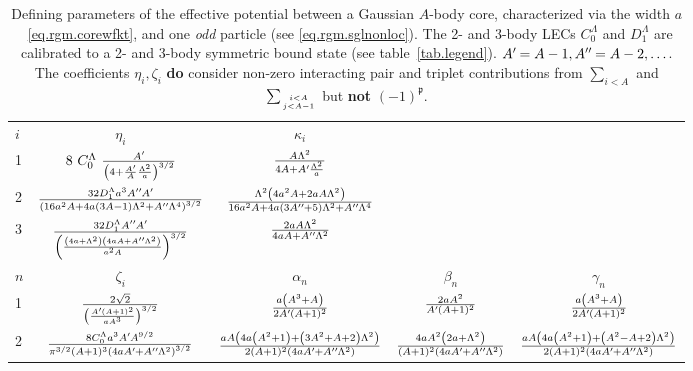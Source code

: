 \documentclass
[aps,nofootinbib,prl,showpacs,twocolumn,groupedaddress,superscriptaddress]
{revtex4}
\newcommand*{\mprime}{^{\prime}\mkern-1.2mu}
\newcommand*{\mdprime}{^{\prime\prime}\mkern-1.2mu}
\begin{document}
\begin{widetext}
\begin{turnpage}
\begin{table}
\setlength{\tabcolsep}{4pt}
\renewcommand{\arraystretch}{2.4}
\caption{\label{tab.rgmpot}{Defining parameters of the effective potential between
a Gaussian $A$-body core, characterized via the width $a$~\eqref{eq.rgm.corewfkt},
and one {\it odd} particle (see \eqref{eq.rgm.sglnonloc}).
The 2- and 3-body LECs $C^\Lambda_0$ and $D^\Lambda_1$ are
calibrated to a 2- and 3-body symmetric bound state (see table~\ref{tab.legend}).
$A\mprime=A-1, A\mdprime=A-2, \ldots$. The coefficients $\eta_i,\zeta_i$ {\bf do}
consider non-zero interacting pair and triplet contributions from $\sum_{i<A}$ and
$\sum_{i<A\atop j<A-1}$ but {\bf not} $(-1)^{\mathfrak{p}}$.}}
\small\centering
\begin{tabular}{lc|ccc}
\hline\hline
$i$ & $\eta_i$ & $\kappa_i$ & & \\
1   & $8~C_0^\Lambda~\frac{A\mprime}{\left(4+\frac{A\mprime}{A}\frac{\Lambda^2}{a}\right)^{3/2}}$  & $\frac{A\Lambda^2}{4A+A\mprime\frac{\Lambda^2}{a}}$ \\
2   & $
\frac{32 D_1^\Lambda a^3 A\mdprime A\mprime}{\left(16 a^2 A+4 a (3 A-1) \Lambda ^2+A\mdprime \Lambda ^4\right)^{3/2}}$ & $\frac{\Lambda ^2 \left(4 a^2 A+2 a A \Lambda ^2\right)}{16 a^2 A+4 a (3 A\mdprime+5) \Lambda ^2+A\mdprime \Lambda ^4}$ \\
3 & 
$\frac{32 D_1^\Lambda A\mdprime A\mprime}{\left(\frac{\left(4 a+\Lambda ^2\right) \left(4 a A+A\mdprime \Lambda ^2\right)}{a^2 A}\right)^{3/2}}$ & $\frac{2 a A \Lambda ^2}{4 a A+A\mdprime \Lambda ^2}$ \\
\hline
$n$ & $\zeta_i$ & $\alpha_n$ & $\beta_n$ & $\gamma_n$ \\
1 &$\frac{2 \sqrt{2}}{\left(\frac{A\mprime (A+1)^2}{a A^3}\right)^{3/2}}$&
$\frac{a \left(A^3+A\right)}{2 A\mprime (A+1)^2}$&
$\frac{2 a A^2}{A\mprime (A+1)^2}$&
$\frac{a \left(A^3+A\right)}{2 A\mprime (A+1)^2}$\\
2 & 
$ \frac{8 C_0^\Lambda a^3 A\mprime A^{9/2}}{\pi ^{3/2} (A+1)^3 \left(4 a A\mprime+A\mdprime \Lambda ^2\right)^{3/2}}  $ & 
$\frac{\text{} a A \left(4 a \left(A^2+1\right)+\left(3 A^2+A+2\right) \Lambda ^2\right)}{2 (A+1)^2 \left(4 a A\mprime+A\mdprime \Lambda ^2\right)}$&
$\frac{4 \text{} a A^2 \left(2 a+\Lambda ^2\right)}{(A+1)^2 \left(4 a A\mprime+A\mdprime \Lambda ^2\right)}$&
$\frac{a A \left(4 a \left(A^2+1\right)+\left(A^2-A+2\right) \Lambda ^2\right)}{2 (A+1)^2 \left(4 a A\mprime+A\mdprime \Lambda ^2\right)}$ \\

\end{tabular}
\end{table}
\end{turnpage}
\end{widetext}
\end{document}
